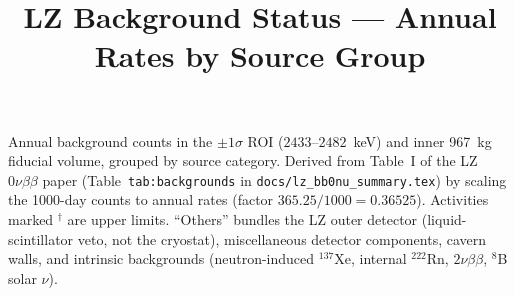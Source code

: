 \documentclass[11pt]{article}
\title{LZ Background Status --- Annual Rates by Source Group}
\author{}
\date{}
\begin{document}
\maketitle

Annual background counts in the $\pm 1\sigma$ ROI ($2433$--$2482$~keV)
and inner 967~kg fiducial volume, grouped by source category. Derived
from Table~I of the LZ $0\nu\beta\beta$ paper (Table~\texttt{tab:backgrounds}
in \texttt{docs/lz\_bb0nu\_summary.tex}) by scaling the 1000-day counts
to annual rates (factor $365.25/1000 = 0.36525$). Activities marked
$^\dagger$ are upper limits. ``Others'' bundles the LZ outer detector
(liquid-scintillator veto, not the cryostat), miscellaneous detector
components, cavern walls, and intrinsic backgrounds (neutron-induced
$^{137}$Xe, internal $^{222}$Rn, $2\nu\beta\beta$, $^{8}$B solar $\nu$).
\end{document}
